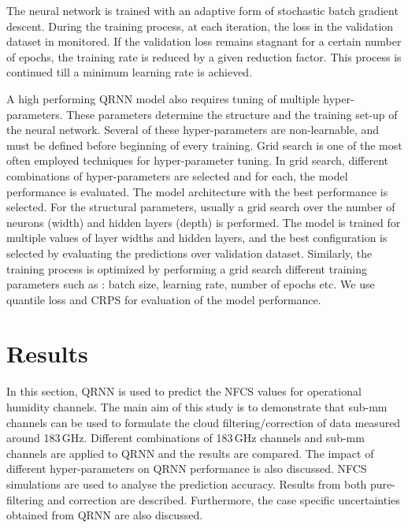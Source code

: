 \documentclass[amt, manuscript]{copernicus}
\begin{document}
The neural network is trained with an adaptive form of stochastic batch gradient descent. During the training process, at each iteration, the loss in the validation dataset in monitored. If the validation loss remains stagnant for a certain number of epochs, the training rate is reduced  by a given reduction factor. This process is continued till a minimum learning rate is achieved.  

A high performing QRNN model also requires tuning of multiple hyper-parameters. These parameters determine the structure and the training set-up of the neural network. Several of these hyper-parameters are non-learnable, and must be defined before beginning of every training. Grid search is one of the most often employed techniques for hyper-parameter tuning. In grid search, different combinations of hyper-parameters are selected and for each, the model performance is evaluated. The model architecture with the best performance is selected. For the structural parameters, usually a grid search over the number of neurons (width) and hidden layers (depth) is performed. The model is trained for multiple values of layer widths and hidden layers, and the best configuration is selected by evaluating the predictions over validation dataset. Similarly, the training process is optimized by performing a grid search different training parameters such as : batch size, learning rate, number of epochs etc. We use quantile loss and CRPS for evaluation of the model performance. 

\section{Results}
%
In this section, QRNN is used to predict the NFCS values for operational humidity channels. The main aim of this study is to demonstrate that sub-mm channels can be used to formulate the cloud filtering/correction of data measured around 183\,GHz. Different combinations of 183\,GHz channels and sub-mm channels are applied to QRNN and the results are compared. The impact of different hyper-parameters on QRNN performance is also discussed. NFCS simulations are used to analyse the prediction accuracy. Results from both pure-filtering and correction are described. Furthermore, the case specific uncertainties obtained from QRNN are also discussed.
 
\end{document}
